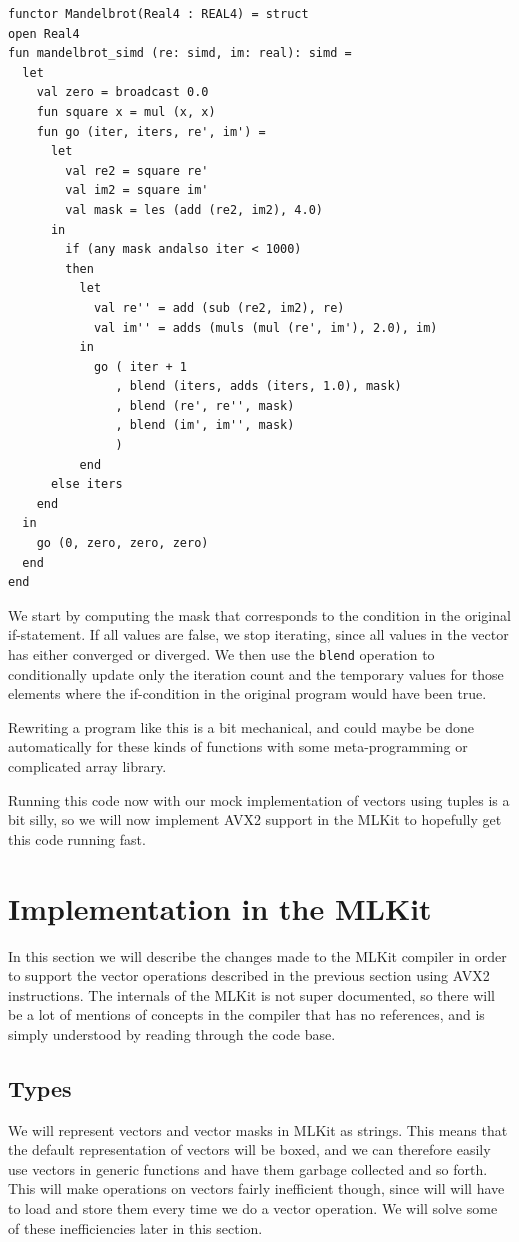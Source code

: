 \documentclass{article}
\begin{document}
\begin{verbatim}
functor Mandelbrot(Real4 : REAL4) = struct
open Real4
fun mandelbrot_simd (re: simd, im: real): simd =
  let
    val zero = broadcast 0.0
    fun square x = mul (x, x)
    fun go (iter, iters, re', im') =
      let
        val re2 = square re'
        val im2 = square im'
        val mask = les (add (re2, im2), 4.0)
      in
        if (any mask andalso iter < 1000)
        then
          let 
            val re'' = add (sub (re2, im2), re)
            val im'' = adds (muls (mul (re', im'), 2.0), im)
          in
            go ( iter + 1
               , blend (iters, adds (iters, 1.0), mask)
               , blend (re', re'', mask)
               , blend (im', im'', mask)
               )
          end
      else iters
    end
  in
    go (0, zero, zero, zero)
  end
end
\end{verbatim}
We start by computing the mask that corresponds to the condition in the original if-statement. If all values are false, we stop iterating, since all values in the vector has either converged or diverged. We then use the \verb!blend! operation to conditionally update only the iteration count and the temporary values for those elements where the if-condition in the original program would have been true.

Rewriting a program like this is a bit mechanical, and could maybe be done automatically for these kinds of functions with some meta-programming or complicated array library.

Running this code now with our mock implementation of vectors using tuples is a bit silly, so we will now implement AVX2 support in the MLKit to hopefully get this code running fast.

\section{Implementation in the MLKit}
In this section we will describe the changes made to the MLKit compiler in order to support the vector operations described in the previous section using AVX2 instructions. The internals of the MLKit is not super documented, so there will be a lot of mentions of concepts in the compiler that has no references, and is simply understood by reading through the code base.

\subsection{Types}
We will represent vectors and vector masks in MLKit as strings. This means that the default representation of vectors will be boxed, and we can therefore easily use vectors in generic functions and have them garbage collected and so forth. This will make operations on vectors fairly inefficient though, since will will have to load and store them every time we do a vector operation. We will solve some of these inefficiencies later in this section. 
\end{document}
